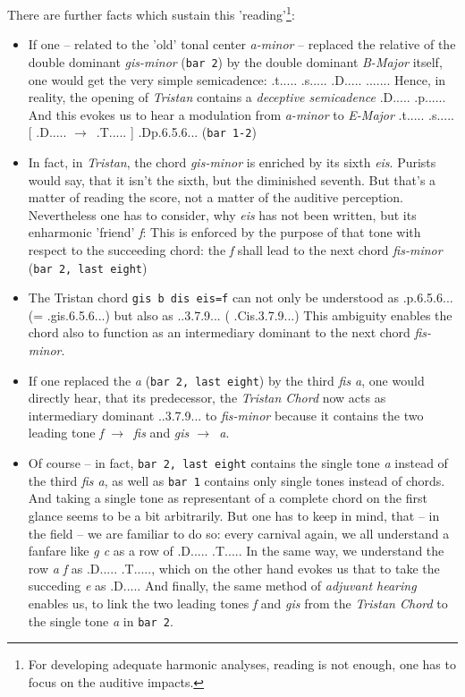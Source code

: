 \documentclass[
  DIV=calc,
  BCOR=5mm,
  12pt,
  headings=small,
  oneside,
  abstract=true,
  toc=bib,
  xcolor=dvipsnames,
  openany,
  ngerman,english]{scrartcl}
\newcommand{\acc}[0]{\textit}
\newcommand{\ra}[0]{$\rightarrow$}
\begin{document}
There are further facts which sustain this 'reading'\footnote{For developing
adequate harmonic analyses, reading is not enough, one has to focus on the
auditive impacts.}:
\begin{itemize}
  \item If one -- related to the 'old' tonal center \acc{a-minor} -- replaced
  the relative of the double dominant \acc{gis-minor} (\texttt{bar 2}) by the
  double dominant \acc{B-Major} itself, one would get the very simple
  semicadence: \HH.t..... \HH.s..... \HH.D..... \HH.\DD...... Hence, in reality,
  the opening of \acc{Tristan} contains a \acc{deceptive semicadence} \HH.D.....
  \HH.{\DD}p...... And this evokes us to hear a modulation
  from \acc{a-minor} to \acc{E-Major} \HH.t..... \HH.s..... [ \HH.D..... \ra\ 
  \HH.T..... ] \HH.Dp.6.5.6... (\texttt{bar 1-2})
  \item In fact, in \acc{Tristan}, the chord \acc{gis-minor} is enriched by its
  sixth \acc{eis}. Purists would say, that it isn't the sixth, but the
  diminished seventh. But that's a matter of reading the score, not a matter of
  the auditive perception. Nevertheless one has to consider, why \acc{eis} has
  not been written, but its enharmonic 'friend' \acc{f}: This is enforced by the
  purpose of that tone with respect to the succeeding chord: the \acc{f} shall
  lead to the next chord \acc{fis-minor} (\texttt{bar 2, last eight}) 
  \item The Tristan chord \texttt{gis b dis eis=f}  can not only be understood
  as \HH.{\DD}p.6.5.6... (= \HH.gis.6.5.6...) but also as \HH.\Dohne.3.7.9... (
  \HH.\Ohne[0,2em]Cis.3.7.9...) This ambiguity enables the chord also to
  function as an intermediary dominant to the next chord \acc{fis-minor}.
  \item If one replaced the \acc{a} (\texttt{bar 2, last eight}) by the third
  \acc{fis a}, one would directly hear, that its predecessor, the \acc{Tristan
  Chord} now acts as intermediary dominant \HH.\Dohne.3.7.9... to
  \acc{fis-minor} because it contains the two leading tone \acc{f \ra\ fis} and
  \acc{gis \ra\ a}.
  \item Of course -- in fact, \texttt{bar 2, last eight} contains the single tone
  \acc{a} instead of the third  \acc{fis a}, as well as \texttt{bar 1} contains
  only single tones instead of chords. And taking a single tone as representant
  of a complete chord on the first glance seems to be a bit arbitrarily. But one
  has to keep in mind, that -- in the field -- we are familiar to do so: every
  carnival again, we all understand a fanfare like \acc{g c} as a row of
  \HH.D..... \HH.T..... In the same way, we understand the row \acc{a f} as
  \HH.D..... \HH.T....., which on the other hand evokes us that to take the
  succeding \acc{e} as \HH.D..... And finally, the same method of \acc{adjuvant
  hearing} enables us, to link the two leading tones \acc{f} and \acc{gis} from
  the \acc{Tristan Chord} to the single tone \acc{a} in \texttt{bar 2}.
\end{itemize}
\end{document}
